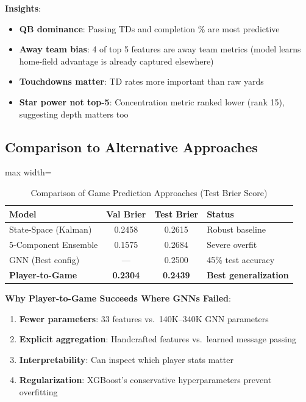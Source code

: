 \textbf{Insights}:
\begin{itemize}
    \item \textbf{QB dominance}: Passing TDs and completion \% are most predictive
    \item \textbf{Away team bias}: 4 of top 5 features are away team metrics (model learns home-field advantage is already captured elsewhere)
    \item \textbf{Touchdowns matter}: TD rates more important than raw yards
    \item \textbf{Star power not top-5}: Concentration metric ranked lower (rank 15), suggesting depth matters too
\end{itemize}

\subsection{Comparison to Alternative Approaches}

\begin{table}[h]
\centering
\caption{Comparison of Game Prediction Approaches (Test Brier Score)}
\label{tab:approach-comparison}
\begin{adjustbox}{max width=\textwidth}
\begin{tabular}{lccl}
\toprule
\textbf{Model} & \textbf{Val Brier} & \textbf{Test Brier} & \textbf{Status} \\
\midrule
State-Space (Kalman) & 0.2458 & 0.2615 & Robust baseline \\
5-Component Ensemble & 0.1575 & 0.2684 & Severe overfit \\
GNN (Best config) & --- & 0.2500 & 45\% test accuracy \\
\textbf{Player-to-Game} & \textbf{0.2304} & \textbf{0.2439} & \textbf{Best generalization} \\
\bottomrule
\end{tabular}
\end{adjustbox}
\end{table}

\textbf{Why Player-to-Game Succeeds Where GNNs Failed}:

\begin{enumerate}
    \item \textbf{Fewer parameters}: 33 features vs.\ 140K--340K GNN parameters
    \item \textbf{Explicit aggregation}: Handcrafted features vs.\ learned message passing
    \item \textbf{Interpretability}: Can inspect which player stats matter
    \item \textbf{Regularization}: XGBoost's conservative hyperparameters prevent overfitting
\end{enumerate}

